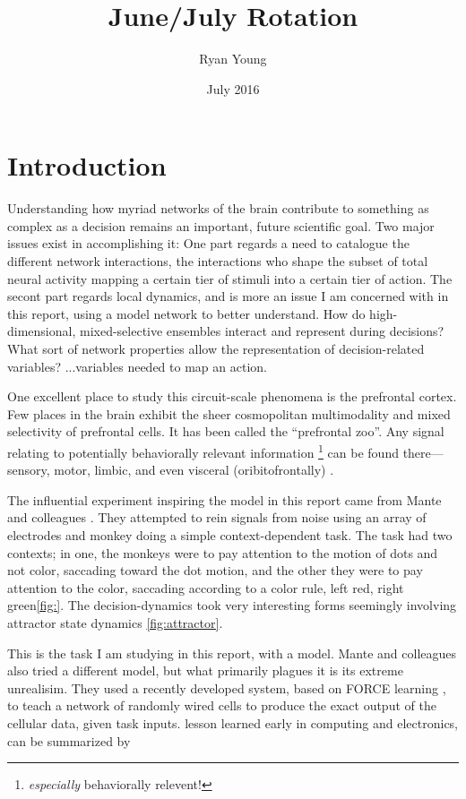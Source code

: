 \documentclass{report}
\title{June/July Rotation}
\author{Ryan Young}
\date{July 2016}
\begin{document}
\maketitle

\section{Introduction}

Understanding how myriad networks of the brain contribute to something as complex as a decision remains an important, future scientific goal. Two major issues exist in accomplishing it: One part regards a need to catalogue the different network interactions, the interactions who shape the subset of total neural activity mapping a certain tier of stimuli into a certain tier of action. The secont part regards local dynamics, and is more an issue I am concerned with in this report, using a model network to better understand. How do high-dimensional, mixed-selective ensembles interact and represent during decisions? What sort of network properties allow the representation of decision-related variables? ...variables needed to map an action.

One excellent place to study this circuit-scale phenomena is the prefrontal cortex. Few places in the brain exhibit the sheer cosmopolitan multimodality and mixed selectivity of prefrontal cells. It has been called the ``prefrontal zoo''. Any signal relating to potentially behaviorally relevant information \footnote{\textit{especially} behaviorally relevent!} can be found there---sensory, motor, limbic, and even visceral (oribitofrontally) \cite{fuster_prefrontal_2015}.

The influential experiment inspiring the model in this report came from Mante and colleagues \cite{mante_context-dependent_2013}. They attempted to rein signals from noise using an array of electrodes and monkey doing a simple context-dependent task. The task had two contexts; in one, the monkeys were to pay attention to the motion of dots and not color, saccading toward the dot motion, and the other they were to pay attention to the color, saccading according to a color rule, left red, right green\ref{fig:}. The decision-dynamics took very interesting forms seemingly involving attractor state dynamics \ref{fig:attractor}.

This is the task I am studying in this report, with a model. Mante and colleagues also tried a different model, but what primarily plagues it is its extreme unrealisim. They used a recently developed system, based on FORCE learning \cite{sussillo_generating_2009}, to teach a network of randomly wired cells to produce the exact output of the cellular data, given task inputs.  lesson learned early in computing and electronics, can be summarized by 
\end{document}
